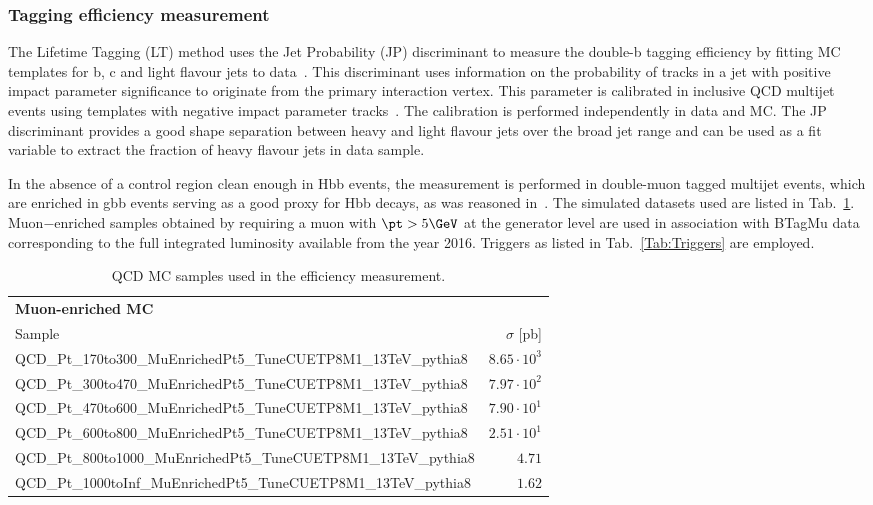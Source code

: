 \subsubsection{Tagging efficiency measurement}
\label{tagging_efficiency}
The Lifetime Tagging (LT) method uses the Jet Probability (JP) discriminant to measure the double-b tagging efficiency by fitting MC templates for b, c and light flavour jets to data~\cite{Ref:LT}. This discriminant uses information on the probability of tracks in a jet with positive impact parameter significance to originate from the primary interaction vertex. This parameter is calibrated in inclusive QCD multijet events using templates with negative impact parameter tracks~\cite{Ref:JP}. The calibration is performed independently in data and MC. The JP discriminant provides a good shape separation between heavy and light flavour jets over the broad jet \pt range and can be used as a fit variable to extract the fraction of heavy flavour jets in data sample.

In the absence of a control region clean enough in Hbb events, the measurement is performed in double-muon tagged multijet events, which are enriched in gbb events serving as a good proxy for Hbb decays, as was reasoned in~\cite{CMS-PAS-BTV-15-002}. The simulated datasets used are listed in Tab.~\ref{Tab:QCDMultijet}. Muon−enriched samples obtained by requiring a muon with $\pt> 5\GeV$ at the generator level are used in association with BTagMu data corresponding to the full integrated luminosity available from the year 2016. Triggers as listed in Tab.~\ref{Tab:Triggers} are employed.




\begin{table}[htb]
 \begin{center}
\footnotesize
  \caption{QCD MC samples used in the efficiency measurement.}
\begin{tabular}{lr}
\hline\hline
{\bf Muon-enriched MC} & \\
\vspace{2mm} Sample & $\sigma $ [pb]  \\
\hline
QCD\_Pt\_170to300\_MuEnrichedPt5\_TuneCUETP8M1\_13TeV\_pythia8 & $8.65 \cdot 10^3$ \\
QCD\_Pt\_300to470\_MuEnrichedPt5\_TuneCUETP8M1\_13TeV\_pythia8 & $7.97 \cdot 10^2$ \\
QCD\_Pt\_470to600\_MuEnrichedPt5\_TuneCUETP8M1\_13TeV\_pythia8 & $7.90 \cdot 10^1$ \\
QCD\_Pt\_600to800\_MuEnrichedPt5\_TuneCUETP8M1\_13TeV\_pythia8 & $2.51 \cdot 10^1$ \\
QCD\_Pt\_800to1000\_MuEnrichedPt5\_TuneCUETP8M1\_13TeV\_pythia8 & $4.71$ \\
QCD\_Pt\_1000toInf\_MuEnrichedPt5\_TuneCUETP8M1\_13TeV\_pythia8 & $1.62$ \\
\hline
\end{tabular}
\normalsize
  \label{Tab:QCDMultijet}
\end{center}
\end{table}

